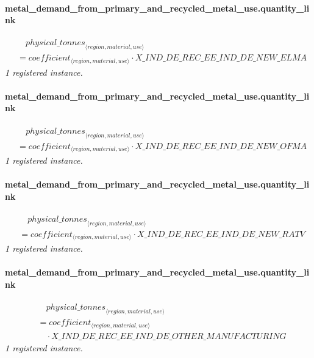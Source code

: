 \documentclass[11pt]{article}
\begin{document}
\paragraph{metal\_demand\_from\_primary\_and\_recycled\_metal\_use.quantity\_link}
\begin{align*}
&\quad {physical\_tonnes}_{\langle region, material, use\rangle}\\
&= coefficient_{\langle region, material, use\rangle} \cdot X\_IND\_DE\_REC\_EE\_IND\_DE\_NEW\_ELMA
\end{align*}
\noindent\emph{1 registered instance.}\par
\paragraph{metal\_demand\_from\_primary\_and\_recycled\_metal\_use.quantity\_link}
\begin{align*}
&\quad {physical\_tonnes}_{\langle region, material, use\rangle}\\
&= coefficient_{\langle region, material, use\rangle} \cdot X\_IND\_DE\_REC\_EE\_IND\_DE\_NEW\_OFMA
\end{align*}
\noindent\emph{1 registered instance.}\par
\paragraph{metal\_demand\_from\_primary\_and\_recycled\_metal\_use.quantity\_link}
\begin{align*}
&\quad {physical\_tonnes}_{\langle region, material, use\rangle}\\
&= coefficient_{\langle region, material, use\rangle} \cdot X\_IND\_DE\_REC\_EE\_IND\_DE\_NEW\_RATV
\end{align*}
\noindent\emph{1 registered instance.}\par
\paragraph{metal\_demand\_from\_primary\_and\_recycled\_metal\_use.quantity\_link}
\begin{align*}
&\quad {physical\_tonnes}_{\langle region, material, use\rangle}\\
&= coefficient_{\langle region, material, use\rangle}\\
&\quad {}\cdot X\_IND\_DE\_REC\_EE\_IND\_DE\_OTHER\_MANUFACTURING
\end{align*}
\noindent\emph{1 registered instance.}\par
\end{document}
